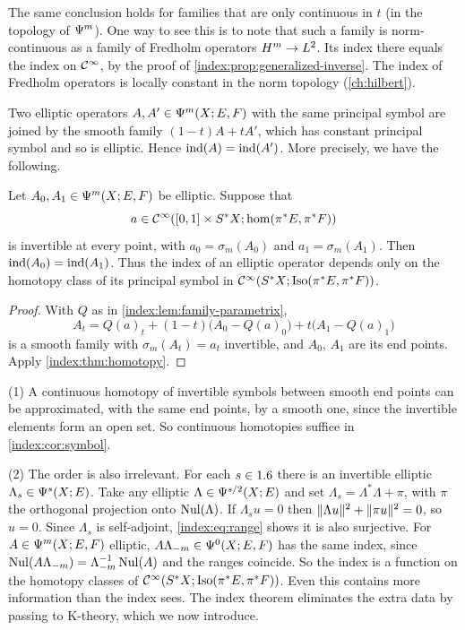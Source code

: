 \begin{remark}\label{index:rem:continuous}
  The same conclusion holds for families that are only continuous in $t$ (in
  the topology of $\Psi^{m}$). One way to see this is to note that such a
  family is norm-continuous as a family of Fredholm operators
  $H^{m}\to L^2$. Its index there equals the index on $\mathcal{C}^\infty$, by the proof of
  \cref{index:prop:generalized-inverse}. The index of Fredholm operators is
  locally constant in the norm topology (\cref{ch:hilbert}).
\end{remark}

Two elliptic operators $A,A'\in\Psi^{m}(X;E,F)$ with the same principal symbol
are joined by the smooth family $(1-t)A+tA'$, which has constant principal
symbol and so is elliptic. Hence $\operatorname{ind}(A)=\operatorname{ind}(A')$. More precisely, we have
the following.

\begin{corollary}\label{index:cor:symbol}
  Let $A_0,A_1\in\Psi^{m}(X;E,F)$ be elliptic. Suppose that
  \begin{equation*}
    a\in\mathcal{C}^\infty([0,1]\times S^*X;\hom(\pi^*E,\pi^*F))
  \end{equation*}
  is invertible at every point, with $a_0=\sigma_m(A_0)$ and $a_1=\sigma_m(A_1)$. Then
  $\operatorname{ind}(A_0)=\operatorname{ind}(A_1)$. Thus the index of an elliptic operator depends only
  on the homotopy class of its principal symbol in
  $\mathcal{C}^\infty(S^*X;\operatorname{Iso}(\pi^*E,\pi^*F))$.
\end{corollary}
\begin{proof}
  With $Q$ as in \cref{index:lem:family-parametrix},
  \begin{equation*}
    A_t=Q(a)_t+(1-t)\bigl(A_0-Q(a)_0\bigr)+t\bigl(A_1-Q(a)_1\bigr)
  \end{equation*}
  is a smooth family with $\sigma_m(A_t)=a_t$ invertible, and $A_0$, $A_1$ are
  its end points. Apply \cref{index:thm:homotopy}.
\end{proof}

\begin{remark}\label{index:rem:order}
  (1) A continuous homotopy of invertible symbols between smooth end points can
  be approximated, with the same end points, by a smooth one, since the
  invertible elements form an open set. So continuous homotopies suffice in
  \cref{index:cor:symbol}.

  (2) The order is also irrelevant. For each $s\in1.6$ there is an invertible
  elliptic $\Lambda_s\in\Psi^{s}(X;E)$. Take any elliptic
  $\Lambda\in\Psi^{s/2}(X;E)$ and set $\Lambda_s=\Lambda^*\Lambda+\pi$, with
  $\pi$ the orthogonal projection onto $\operatorname{Nul}(\Lambda)$. If
  $\Lambda_su=0$ then $\lVert \Lambda u\rVert^2+\lVert \pi u\rVert^2=0$, so $u=0$. Since
  $\Lambda_s$ is self-adjoint, \eqref{index:eq:range} shows it is also
  surjective. For $A\in\Psi^{m}(X;E,F)$ elliptic,
  $A\Lambda_{-m}\in\Psi^{0}(X;E,F)$ has the same index, since
  $\operatorname{Nul}(A\Lambda_{-m})=\Lambda_{-m}^{-1}\operatorname{Nul}(A)$ and the ranges coincide. So
  the index is a function on the homotopy classes of
  $\mathcal{C}^\infty(S^*X;\operatorname{Iso}(\pi^*E,\pi^*F))$. Even this contains more information than
  the index sees. The index theorem eliminates the extra data by passing to
  K-theory, which we now introduce.
\end{remark}

